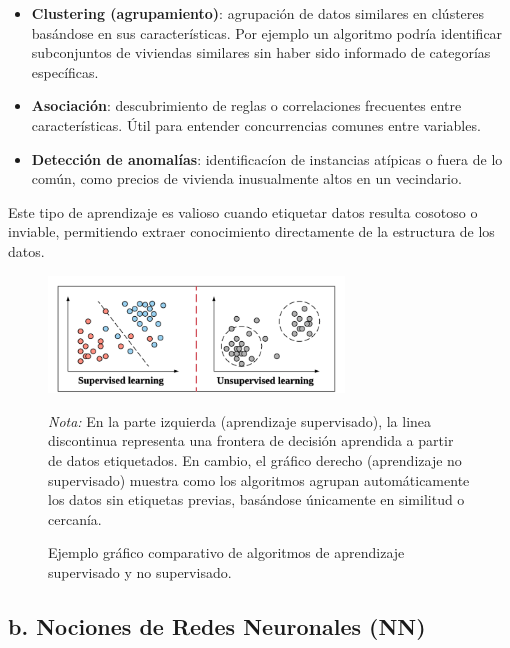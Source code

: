 \documentclass[11pt]{article} %
\begin{document}
\begin{itemize}
    \begin{itemize}
        \item \textbf{Clustering (agrupamiento)}: agrupación de datos similares en clústeres basándose en sus características. Por ejemplo un algoritmo podría identificar subconjuntos de viviendas similares sin haber sido informado de categorías específicas.
        \item\textbf{Asociación}: descubrimiento de reglas o correlaciones frecuentes entre características. Útil para entender concurrencias comunes entre variables.
        \item\textbf{Detección de anomalías}: identificacíon de instancias atípicas o fuera de lo común, como precios de vivienda inusualmente altos en un vecindario.
    \end{itemize}
    Este tipo de aprendizaje es valioso cuando etiquetar datos resulta cosotoso o inviable, permitiendo extraer conocimiento directamente de la estructura de los datos.
\end{itemize}
\begin{figure}[H]
\centering
\includegraphics[width=0.7\textwidth]{Images/Examples-of-Supervised-Learning-Linear-Regression-and-Unsupervised-Learning.png}
\caption{Ejemplo gráfico comparativo de algoritmos de aprendizaje supervisado y no supervisado.}
\label{fig:aprendizaje-supervisado-no-supervisado}
\vspace{2mm}
\small\textit{Nota:} En la parte izquierda (aprendizaje supervisado), la linea discontinua representa una frontera de decisión aprendida a partir de datos etiquetados. En cambio, el gráfico derecho (aprendizaje no supervisado) muestra como los algoritmos agrupan automáticamente los datos sin etiquetas previas, basándose únicamente en similitud o cercanía.
\end{figure}
\subsection*{b. Nociones de Redes Neuronales (NN)}
\vspace{5pt}
\end{document}
